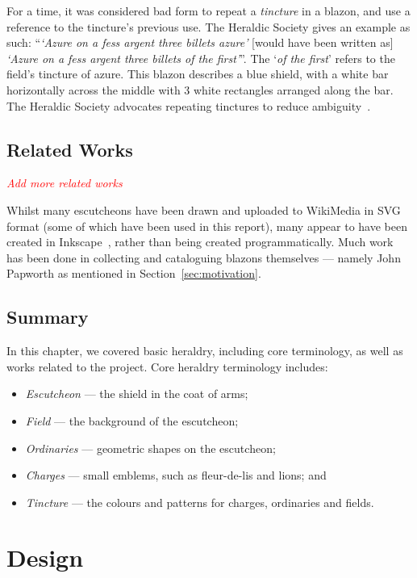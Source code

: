 \documentclass[nobib, a4paper, twoside, justified]{tufte-book}
\newcommand{\todo}[1]{{\noindent\textcolor{Red}{\textit{\quad#1}}\par}}
\begin{document}
For a time, it was considered bad form to repeat a \textit{tincture} in a blazon, and use a
reference to the tincture's previous use. The Heraldic Society gives an example as such:
``\textit{`Azure on a fess argent three billets azure'} [would have been written as] \textit{`Azure
on a fess argent three billets of the first'}''. The `\textit{of the first}' refers to the field's
tincture of azure. This blazon describes a blue shield, with a white bar horizontally across the
middle with 3 white rectangles arranged along the bar. The Heraldic Society advocates repeating
tinctures to reduce ambiguity~\autocite{blazon_in_coa}.

\section{Related Works}%
\label{sec:related_works}

\todo{Add more related works}

Whilst many escutcheons have been drawn and uploaded to WikiMedia in SVG format (some of which have
been used in this report), many appear to have been created in Inkscape~\autocite{inkscape}, rather
than being created programmatically.  Much work has been done in collecting and cataloguing blazons
themselves --- namely John Papworth as mentioned in Section~\ref{sec:motivation}.

\section{Summary}%
\label{sec:background_summary}

In this chapter, we covered basic heraldry, including core terminology, as well as works related to
the project. Core heraldry terminology includes:

\begin{itemize}
  \item \textit{Escutcheon} --- the shield in the coat of arms;
  \item \textit{Field} --- the background of the escutcheon;
  \item \textit{Ordinaries} --- geometric shapes on the escutcheon;
  \item \textit{Charges} --- small emblems, such as fleur-de-lis and lions; and
  \item \textit{Tincture} --- the colours and patterns for charges, ordinaries and fields.
\end{itemize}

\chapter{Design}%
\label{cha:design}
\end{document}
